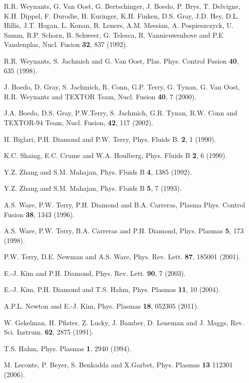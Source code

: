 \documentclass[aip,pop,amsmath,amssymb,reprint,superscriptaddress]{revtex4-1} %
\begin{document}
\begin{thebibliography}{10}
R.R. Weynants, G. Van Oost, G. Bertschinger, J. Boedo, P. Brys, T. Delvigne, K.H. Dippel, F. Durodie, H. Euringer, K.H. Finken, D.S. Gray, J.D. Hey, D.L. Hillis, J.T. Hogan, L. Konan, R. Leners, A.M. Messian, A. Pospieszczyck, U. Samm, R.P. Schorn, B. Schweer, G. Telesca, R. Vannieuwenhove and P.E Vandenplas, Nucl. Fusion {\bf 32},  837  (1992).

R.R. Weynants, S. Jachmich and G. Van Oost, Plas. Phys. Control Fusion {\bf 40}, 635 (1998).

J. Boedo, D. Gray, S. Jachmich, R. Conn, G.P. Terry, G. Tynan, G. Van Oost, R.R. Weynants and TEXTOR Team, Nucl. Fusion {\bf 40},  7  (2000).

J.A. Boedo, D.S. Gray, P.W.Terry, S. Jachmich, G.R. Tynan, R.W. Conn and TEXTOR-94 Team, Nucl. Fusion, {\bf 42}, 117 (2002).

H. Biglari, P.H. Diamond and P.W. Terry, Phys. Fluids B. {\bf 2},  1  (1990).

K.C. Shaing, E.C. Crume and W.A. Houlberg, Phys. Fluids B {\bf 2}, 6 (1990).

Y.Z. Zhang and S.M. Mahajan, Phys. Fluids B {\bf 4}, 1385 (1992).

Y.Z. Zhang and S.M. Mahajan, Phys. Fluids B {\bf 5}, 7 (1993).

A.S. Ware, P.W. Terry, P.H. Diamond and B.A. Carreras, Plasma Phys. Control Fusion {\bf 38},  1343  (1996).

A.S. Ware, P.W. Terry, B.A. Carreras and P.H. Diamond, Phys. Plasmas {\bf 5}, 173 (1998).

P.W. Terry, D.E. Newman and A.S. Ware, Phys. Rev. Lett. {\bf 87}, 185001  (2001).

E.-J. Kim and P.H. Diamond, Phys. Rev. Lett. {\bf 90}, 7 (2003).

E.-J. Kim, P.H. Diamond and T.S. Hahm, Phys. Plasmas {\bf 11},  10  (2004).

A.P.L. Newton and E.-J. Kim, Phys. Plasmas {\bf 18}, 052305 (2011).

W. Gekelman, H. Pfister, Z. Lucky, J. Bamber, D. Leneman and J. Maggs, Rev. Sci. Instrum. {\bf 62},  2875  (1991).

T.S. Hahm, Phys. Plasmas {\bf 1}, 2940 (1994).

M. Leconte, P. Beyer, S. Benkadda and X.Garbet, Phys. Plasmas {\bf 13} 112301 (2006).


\end{thebibliography}
\end{document}
